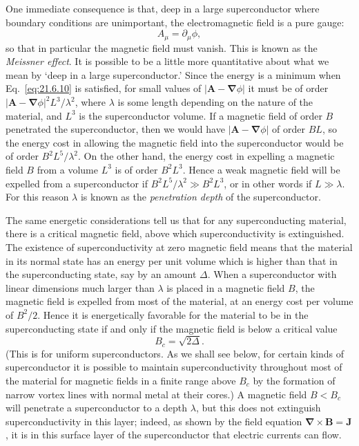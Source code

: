 One immediate consequence is that, deep in a large superconductor where boundary conditions are unimportant, the electromagnetic field is a pure gauge:
\begin{equation}
A_\mu=\partial_\mu\phi,
\tag{21.6.10}\label{eq:21.6.10}
\end{equation}
so that in particular the magnetic field must vanish. This is known as the \emph{Meissner effect}. It is possible to be a little more quantitative about what we mean by `deep in a large superconductor.' Since the energy is a minimum when Eq.~\eqref{eq:21.6.10} is satisfied, for small values of $|\mathbf A-\boldsymbol\nabla\phi|$ it must be of order $|\mathbf A-\boldsymbol\nabla\phi|^2L^3/\lambda^2$, where $\lambda$ is some length depending on the nature of the material, and $L^3$ is the superconductor volume. If a magnetic field of order $B$ penetrated the superconductor, then we would have $|\mathbf A-\boldsymbol\nabla\phi|$ of order $BL$, so the energy cost in allowing the magnetic field into the superconductor would be of order $B^2L^5/\lambda^2$. On the other hand, the energy cost in expelling a magnetic field $B$ from a volume $L^3$ is of order $B^2L^3$. Hence a weak magnetic field will be expelled from a superconductor if $B^2L^5/\lambda^2\gg B^2L^3$, or in other words if $L\gg\lambda$. For this reason $\lambda$ is known as the \emph{penetration depth} of the superconductor.

The same energetic considerations tell us that for any superconducting material, there is a critical magnetic field, above which superconductivity is extinguished. The existence of superconductivity at zero magnetic field means that the material in its normal state has an energy per unit volume which is higher than that in the superconducting state, say by an amount $\Delta$. When a superconductor with linear dimensions much larger than $\lambda$ is placed in a magnetic field $B$, the magnetic field is expelled from most of the material, at an energy cost per volume of $B^2/2$. Hence it is energetically favorable for the material to be in the superconducting state if and only if the magnetic field is below a critical value
\begin{equation}
B_c=\sqrt{2\Delta}.
\tag{21.6.11}\label{eq:21.6.11}
\end{equation}
(This is for uniform superconductors. As we shall see below, for certain kinds of superconductor it is possible to maintain superconductivity throughout most of the material for magnetic fields in a finite range above $B_c$ by the formation of narrow vortex lines with normal metal at their cores.) A magnetic field $B<B_c$ will penetrate a superconductor to a depth $\lambda$, but this does not extinguish superconductivity in this layer; indeed, as shown by the field equation $\boldsymbol\nabla\mathbin{\times}\mathbf B=\mathbf J$, it is in this surface layer of the superconductor that electric currents can flow.

